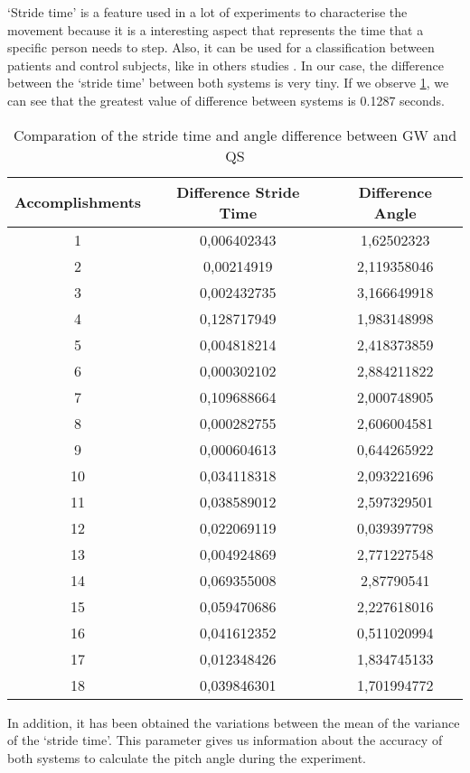 ‘Stride time’ is a feature used in a lot of experiments to characterise the movement because it is a interesting aspect that represents the time that a specific person needs to step. Also, it can be used for a classification between patients and control subjects, like in others studies \cite{Hausdorff}.
In our case, the difference between  the ‘stride time’ between both systems is very tiny. If we observe \ref{tab:Stride_time}, we can see that the greatest value of difference between systems is 0.1287 seconds.

\begin{table}[h]
	\caption{Comparation of the stride time and angle difference between GW and QS}	
	\centering
	\begin{tabular}{|c|c|c|}\hline
		
		Accomplishments & Difference Stride Time	& Difference Angle	 	\\ \hline
		1  & 0,006402343	 & 1,62502323 \\
		2 & 0,00214919	& 2,119358046 \\
		3 & 0,002432735	& 3,166649918 \\
		4 & 0,128717949	& 1,983148998 \\
		5 & 0,004818214	& 2,418373859 \\
		6 & 0,000302102	& 2,884211822 \\
		7 & 0,109688664	& 2,000748905 \\
		8 & 0,000282755	& 2,606004581 \\
		9 & 0,000604613	 & 0,644265922 \\
		10 & 0,034118318	& 2,093221696 \\
		11 & 0,038589012	& 2,597329501 \\
		12 & 0,022069119	& 0,039397798 \\
		13 & 0,004924869	& 2,771227548 \\
		14 & 0,069355008	& 2,87790541 \\
		15 & 0,059470686	& 2,227618016 \\
		16 & 0,041612352	& 0,511020994 \\
		17 & 0,012348426	& 1,834745133 \\
		18 & 0,039846301	& 1,701994772 \\
	\hline
	\end{tabular}
	\label{tab:Stride_time}
	
\end{table}

In addition, it has been obtained the variations between the mean of the variance of the ‘stride time’. This parameter gives us information about the accuracy of both systems to calculate the pitch angle during the experiment.

